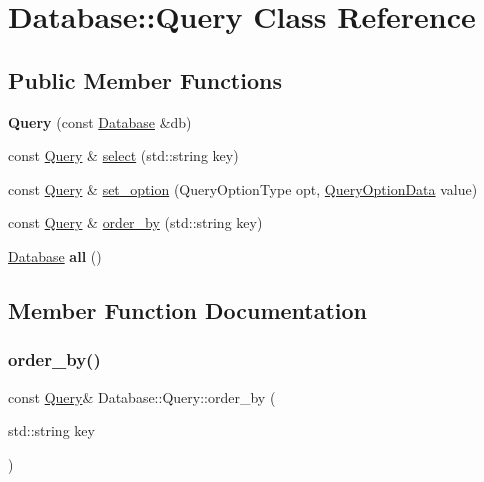 \hypertarget{class_database_1_1_query}{}\section{Database\+:\+:Query Class Reference}
\label{class_database_1_1_query}
\subsection*{Public Member Functions}
\begin{DoxyCompactItemize}
\item 
\mbox{\label{class_database_1_1_query_ad5836c20a5d0611b8d6cdacdc228057f}} 
{\bfseries Query} (const \hyperlink{class_database}{Database} \&db)
\item 
const \hyperlink{class_database_1_1_query}{Query} \& \hyperlink{class_database_1_1_query_a020ff17d626e968eb94c7f6932d375a4}{select} (std\+::string key)
\item 
const \hyperlink{class_database_1_1_query}{Query} \& \hyperlink{class_database_1_1_query_a331879c9d479b94cf19c79b9b3a2eddc}{set\+\_\+option} (Query\+Option\+Type opt, \hyperlink{union_query_option_data}{Query\+Option\+Data} value)
\item 
const \hyperlink{class_database_1_1_query}{Query} \& \hyperlink{class_database_1_1_query_a920f38ec4ae0d11a1792e4c412506cb2}{order\+\_\+by} (std\+::string key)
\item 
\mbox{\label{class_database_1_1_query_a556b41f8b42a631adec49f70da8ef9b9}} 
\hyperlink{class_database}{Database} {\bfseries all} ()
\end{DoxyCompactItemize}


\subsection{Member Function Documentation}
\mbox{\label{class_database_1_1_query_a920f38ec4ae0d11a1792e4c412506cb2}} 
\subsubsection{\texorpdfstring{order\+\_\+by()}{order\_by()}}
{\footnotesize\ttfamily const \hyperlink{class_database_1_1_query}{Query}\& Database\+::\+Query\+::order\+\_\+by (\begin{DoxyParamCaption}\item[{std\+::string}]{key }\end{DoxyParamCaption})}

